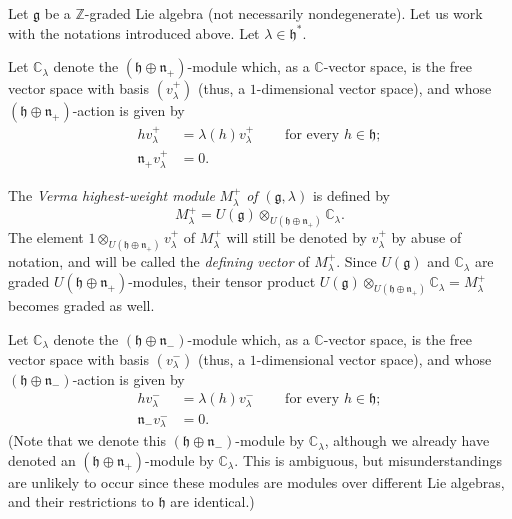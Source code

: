 \documentclass[etingof-lie.tex]{subfiles}
\begin{document}
\begin{definition}
\label{def.verma}Let $\mathfrak{g}$ be a $\mathbb{Z}$-graded Lie algebra (not
necessarily nondegenerate). Let us work with the notations introduced above.
Let $\lambda\in\mathfrak{h}^{\ast}$.

Let $\mathbb{C}_{\lambda}$ denote the $\left(  \mathfrak{h}\oplus
\mathfrak{n}_{+}\right)  $-module which, as a $\mathbb{C}$-vector space, is
the free vector space with basis $\left(  v_{\lambda}^{+}\right)  $ (thus, a
$1$-dimensional vector space), and whose $\left(  \mathfrak{h}\oplus
\mathfrak{n}_{+}\right)  $-action is given by%
\begin{align*}
hv_{\lambda}^{+}  &  =\lambda\left(  h\right)  v_{\lambda}^{+}%
\ \ \ \ \ \ \ \ \ \ \text{for every }h\in\mathfrak{h};\\
\mathfrak{n}_{+}v_{\lambda}^{+}  &  =0.
\end{align*}


The \textit{Verma highest-weight module }$M_{\lambda}^{+}$ \textit{of
}$\left(  \mathfrak{g},\lambda\right)  $ is defined by%
\[
M_{\lambda}^{+}=U\left(  \mathfrak{g}\right)  \otimes_{U\left(  \mathfrak{h}%
\oplus\mathfrak{n}_{+}\right)  }\mathbb{C}_{\lambda}.
\]
The element $1\otimes_{U\left(  \mathfrak{h}\oplus\mathfrak{n}_{+}\right)
}v_{\lambda}^{+}$ of $M_{\lambda}^{+}$ will still be denoted by $v_{\lambda
}^{+}$ by abuse of notation, and will be called the \textit{defining vector}
of $M_{\lambda}^{+}$. Since $U\left(  \mathfrak{g}\right)  $ and
$\mathbb{C}_{\lambda}$ are graded $U\left(  \mathfrak{h}\oplus\mathfrak{n}%
_{+}\right)  $-modules, their tensor product $U\left(  \mathfrak{g}\right)
\otimes_{U\left(  \mathfrak{h}\oplus\mathfrak{n}_{+}\right)  }\mathbb{C}%
_{\lambda}=M_{\lambda}^{+}$ becomes graded as well.

Let $\mathbb{C}_{\lambda}$ denote the $\left(  \mathfrak{h}\oplus
\mathfrak{n}_{-}\right)  $-module which, as a $\mathbb{C}$-vector space, is
the free vector space with basis $\left(  v_{\lambda}^{-}\right)  $ (thus, a
$1$-dimensional vector space), and whose $\left(  \mathfrak{h}\oplus
\mathfrak{n}_{-}\right)  $-action is given by%
\begin{align*}
hv_{\lambda}^{-}  &  =\lambda\left(  h\right)  v_{\lambda}^{-}%
\ \ \ \ \ \ \ \ \ \ \text{for every }h\in\mathfrak{h};\\
\mathfrak{n}_{-}v_{\lambda}^{-}  &  =0.
\end{align*}
(Note that we denote this $\left(  \mathfrak{h}\oplus\mathfrak{n}_{-}\right)
$-module by $\mathbb{C}_{\lambda}$, although we already have denoted an
$\left(  \mathfrak{h}\oplus\mathfrak{n}_{+}\right)  $-module by $\mathbb{C}%
_{\lambda}$. This is ambiguous, but misunderstandings are unlikely to occur
since these modules are modules over different Lie algebras, and their
restrictions to $\mathfrak{h}$ are identical.)


\end{definition}
\end{document}
